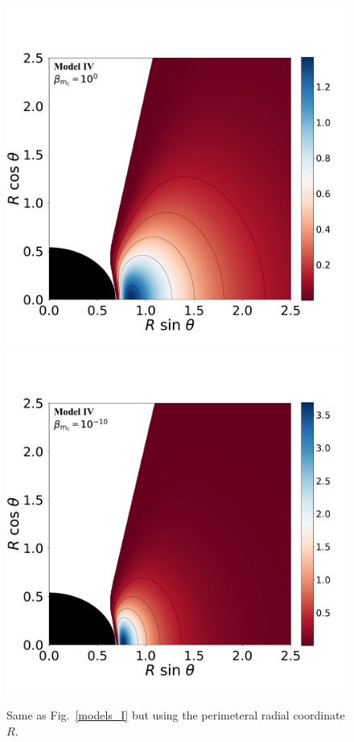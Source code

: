 \documentclass[twocolumn,aps,showpacs,showkeys,prd,superscriptaddress,byrevtex, amsmath]{revtex4-1}
\begin{document}
\begin{figure}
\hspace{-0.3cm}
\includegraphics[scale=0.14]{figures/fig3_IV_1.pdf}
\hspace{-0.2cm}
\includegraphics[scale=0.14]{figures/fig3_IV__10.pdf}
\hspace{-0.2cm}
\caption{Same as Fig.~\ref{models_I} but using the perimeteral radial coordinate $R$.}
\label{models_peri_I}
\end{figure}
\end{document}
